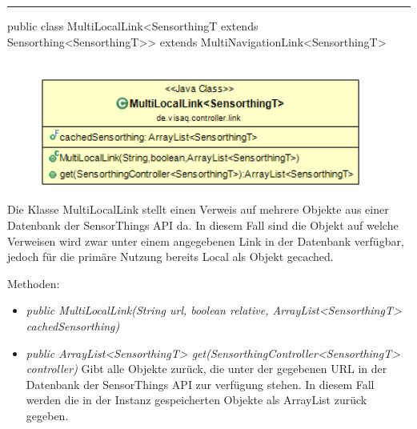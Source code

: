 \rule{\textwidth}{0.4pt}
public class MultiLocalLink<SensorthingT extends Sensorthing<SensorthingT>> extends MultiNavigationLink<SensorthingT>
\\\\
\begin{minipage}{0.5\textwidth}
    \begin{figure}[H]
        {\centering\includegraphics[width=0.95\textwidth]{media/backend/controller/classes/MultiLocalLink.png}}
    \end{figure}
    \end{minipage} \hfill
\begin{minipage}{0.5\textwidth}
    Die Klasse MultiLocalLink stellt einen Verweis auf mehrere Objekte aus einer Datenbank der \gls{SensorThings API} da.
    In diesem Fall sind die Objekt auf welche Verweisen wird zwar unter einem angegebenen Link in der Datenbank verfügbar, jedoch für die primäre Nutzung bereits Local als Objekt gecached.
\end{minipage}

Methoden:
\begin{itemize}
    \item \emph{public MultiLocalLink(String url, boolean relative, ArrayList<SensorthingT> cachedSensorthing)}
    \relativeDescription
    \item \emph{public ArrayList<SensorthingT> get(SensorthingController<SensorthingT> controller)}
    Gibt alle Objekte zurück, die unter der gegebenen URL in der Datenbank der \gls{SensorThings API} zur verfügung stehen.
    In diesem Fall werden die in der Instanz gespeicherten Objekte als ArrayList zurück gegeben.
\end{itemize}

